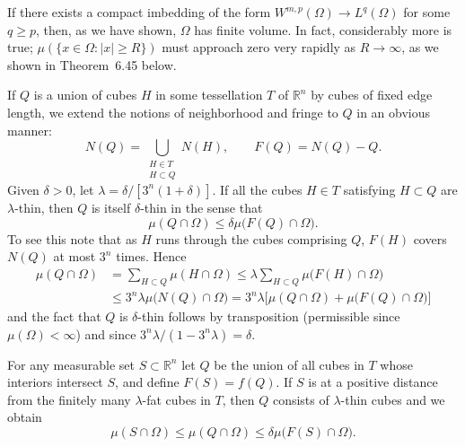 \begin{para}
  If there exists a compact imbedding of the form $W^{m,p}(\Omega)\to L^q(\Omega)$
  for some $q\geq p$, then, as we have shown, $\Omega$ has finite volume.
  In fact, considerably more is true; $\mu(\{x\in\Omega: |x|\geq R\})$
  must approach zero very rapidly as $R\to\infty$, as we shown in Theorem~6.45 below.

  If $Q$ is a union of cubes $H$ in some tessellation $T$ of $\mathbb{R}^n$
  by cubes of fixed edge length, we extend the notions of neighborhood
  and fringe to $Q$ in an obvious manner:
  \[ N(Q) = \bigcup_{\substack{H\in T \\ H\subset Q}} N(H),
      \qquad F(Q) = N(Q)-Q. \]
  Given $\delta>0$, let $\lambda=\delta/[3^n(1+\delta)]$. If all the cubes
  $H\in T$ satisfying $H\subset Q$ are $\lambda$-thin, then $Q$ is itself
  $\delta$-thin in the sense that
  \[ \mu(Q\cap\Omega) \leq \delta \mu\bigl(F(Q)\cap\Omega\bigr). \]
  To see this note that as $H$ runs through the cubes comprising $Q$,
  $F(H)$ covers $N(Q)$ at most $3^n$ times. Hence
  \begin{align*}
    \mu(Q\cap\Omega)
    & = \sum_{H\subset Q} \mu(H\cap\Omega)
      \leq \lambda\sum_{H\subset Q} \mu\bigl(F(H)\cap\Omega\bigr) \\
    & \leq 3^n \lambda \mu\bigl(N(Q)\cap\Omega\bigr)
      = 3^n \lambda \bigl[\mu(Q\cap\Omega) + \mu\bigl(F(Q)\cap\Omega\bigr)\bigr]
  \end{align*}
  and the fact that $Q$ is $\delta$-thin follows by transposition
  (permissible since $\mu(\Omega)<\infty$) and since $3^n\lambda/(1-3^n\lambda)=\delta$.

  For any measurable set $S\subset \mathbb{R}^n$ let $Q$ be the union of all
  cubes in $T$ whose interiors intersect $S$, and define
  $F(S)=f(Q)$. If $S$ is at a positive distance from the finitely
  many $\lambda$-fat cubes in $T$, then $Q$ consists of $\lambda$-thin
  cubes and we obtain
  \begin{equation}\label{eq:6.25}
    \mu(S\cap\Omega) \leq \mu(Q\cap\Omega) \leq \delta \mu\bigl(F(S)\cap\Omega\bigr).
  \end{equation}
\end{para}



